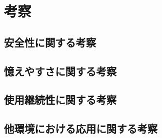 \chapter{考察}\label{chap:discussion}

\section{安全性に関する考察}\label{sec:safety}

\section{憶えやすさに関する考察}\label{sec:memorable}


\section{使用継続性に関する考察}\label{sec:continuity}
%
\section{他環境における応用に関する考察}\label{sec:application}

\newpage

